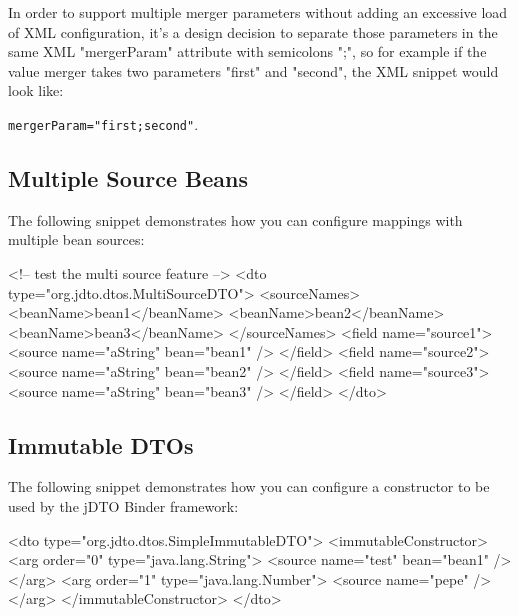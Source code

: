 \documentclass[11pt]{article}
\newcommand{\JDTO}{jDTO Binder\xspace}
\begin{document}

In order to support multiple merger parameters without adding an excessive load of XML configuration, it's a design decision to separate those parameters in the same XML "mergerParam" attribute with semicolons ";", so for example if the value merger takes two parameters "first" and "second", the XML snippet would look like:

\texttt{mergerParam="first;second"}.

\subsection{Multiple Source Beans}

The following snippet demonstrates how you can configure mappings with multiple bean sources:

\begin{xml}
<!-- test the multi source feature -->
<dto type="org.jdto.dtos.MultiSourceDTO">
    <sourceNames>
        <beanName>bean1</beanName>
        <beanName>bean2</beanName>
        <beanName>bean3</beanName>
    </sourceNames>
    <field name="source1">
        <source name="aString" bean="bean1" />
    </field>
    <field name="source2">
        <source name="aString" bean="bean2" />
    </field>
    <field name="source3">
        <source name="aString" bean="bean3" />
    </field>
</dto> 
\end{xml}


\subsection{Immutable DTOs}

The following snippet demonstrates how you can configure a constructor to be used by the \JDTO framework:

\begin{xml}
<dto type="org.jdto.dtos.SimpleImmutableDTO">
    <immutableConstructor>
        <arg order="0" type="java.lang.String">
            <source name="test" bean="bean1" />
        </arg>
        <arg order="1" type="java.lang.Number">
            <source name="pepe" />
        </arg>
    </immutableConstructor>
</dto>
\end{xml}
\end{document}
